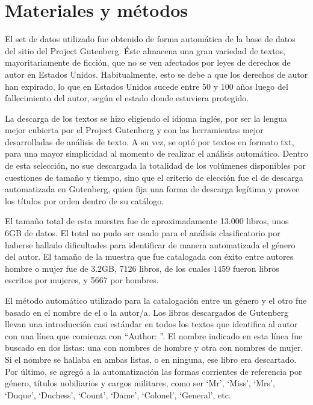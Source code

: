 \documentclass[
journal=jacsat, %
manuscript=article]{achemso}
\begin{document}
\section{Materiales y métodos}

El set de datos utilizado fue obtenido de forma automática de la base de datos del sitio del Project Gutenberg\cite{gutenberg}. Éste almacena una gran variedad de textos, mayoritariamente de ficción, que no se ven afectados por leyes de derechos de autor en Estados Unidos. Habitualmente, esto se debe a que los derechos de autor han expirado, lo que en Estados Unidos sucede entre 50 y 100 años luego del fallecimiento del autor, según el estado donde estuviera protegido.

La descarga de los textos se hizo eligiendo el idioma inglés, por ser la lengua mejor cubierta por el Project Gutenberg y con las herramientas mejor desarrolladas de análisis de texto. A su vez, se optó por textos en formato txt, para una mayor simplicidad al momento de realizar el análisis automático. Dentro de esta selección, no sue descargada la totalidad de los volúmenes disponibles por cuestiones de tamaño y tiempo, sino que el criterio de elección fue el de descarga automatizada en Gutenberg, quien fija una forma de descarga legítima y provee los títulos por orden dentro de su catálogo\cite{gutenberg_robot}.

El tamaño total de esta muestra fue de aproximadamente 13.000 libros, unos 6GB de datos. El total no pudo ser usado para el análisis clasificatorio por haberse hallado dificultades para identificar de manera automatizada el género del autor. El tamaño de la muestra que fue catalogada con éxito entre autores hombre o mujer fue de 3.2GB, 7126 libros, de los cuales 1459 fueron libros escritos por mujeres, y 5667 por hombres.

El método automático utilizado para la catalogación entre un género y el otro fue basado en el nombre de el o la autor/a. Los libros descargados de Gutenberg llevan una introducción casi estándar en todos los textos que identifica al autor con una línea que comienza con “Author: ”. El nombre indicado en esta línea fue buscado en dos listas: una con nombres de hombre y otra con nombres de mujer\cite{wordLists}. Si el nombre se hallaba en ambas listas, o en ninguna, ese libro era descartado. Por último, se agregó a la automatización las formas corrientes de referencia por género, títulos nobiliarios y cargos militares, como ser ‘Mr’, ‘Miss’, ‘Mrs’, ‘Duque’, ‘Duchess’, ‘Count’, ‘Dame’, ‘Colonel’, ‘General’, etc.
\end{document}
